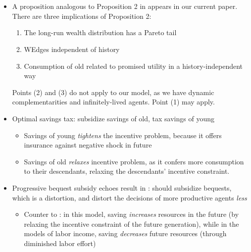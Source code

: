 \documentclass[11pt]{article}
\begin{document}
\section{\cite{shourideh2014optimal}}
\begin{itemize}
    \item A proposition analogous to Proposition 2 in \cite{shourideh2014optimal} appears in our current paper. There are three implications of Proposition 2: 
    \begin{enumerate}
        \item The long-run wealth distribution has a Pareto tail
        \item WEdges independent of history
        \item Consumption of old related to promised utility in a history-independent way
    \end{enumerate}
    Points (2) and (3) do not apply to our model, as we have dynamic complementarities and infinitely-lived agents. Point (1) may apply. 
    \item Optimal savings tax: subsidize savings of old, tax savings of young 
    \begin{itemize}
        \item Savings of young \textit{tightens} the incentive problem, because it offers insurance against negative shock in future 
        \item Savings of old \textit{relaxes} incentive problem, as it confers more consumption to their descendants, relaxing the descendants' incentive constraint.
    \end{itemize} 
    \item Progressive bequest subsidy echoes result in \cite{farhi2010progressive}: should subsidize bequests, which is a distortion, and distort the decisions of more productive agents \textit{less}
    \begin{itemize}
        \item Counter to \cite{golosov2003optimal}: in this model, saving \textit{increases} resources in the future (by relaxing the incentive constraint of the future generation), while in the models of labor income, saving \textit{decreases} future resources (through diminished labor effort)
    \end{itemize}
\end{itemize}
\end{document}
